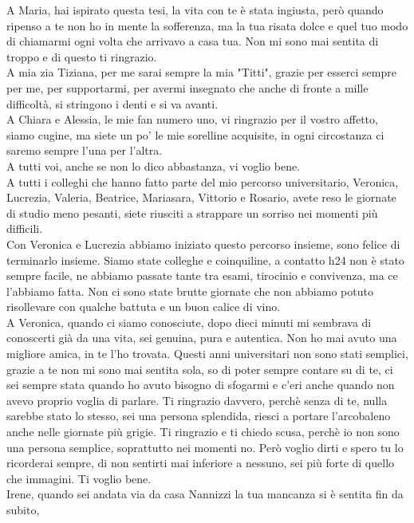 A Maria, hai ispirato questa tesi, la vita con te è stata ingiusta, però quando ripenso a te non ho in mente
la sofferenza, ma la tua risata dolce e quel tuo modo di chiamarmi ogni volta che arrivavo a casa tua. Non mi sono mai 
sentita di troppo e di questo ti ringrazio.\\
A mia zia Tiziana, per me sarai sempre la mia "Titti", grazie per esserci sempre per me, per supportarmi, per avermi
insegnato che anche di fronte a mille difficoltà, si stringono i denti e si va avanti.\\
A Chiara e Alessia, le mie fan numero uno, vi ringrazio per il vostro affetto, siamo cugine, ma siete un po' le mie 
sorelline acquisite, in ogni circostanza ci saremo sempre l’una per l’altra.\\
A tutti voi, anche se non lo dico abbastanza, vi voglio bene.\\
A tutti i colleghi che hanno fatto parte del mio percorso universitario, 
Veronica, Lucrezia, Valeria, Beatrice, Mariasara, Vittorio e Rosario, avete reso le giornate di studio meno 
pesanti, siete riusciti a strappare un sorriso nei momenti più difficili.\\
Con Veronica e Lucrezia abbiamo iniziato questo percorso insieme, sono felice di terminarlo insieme. 
Siamo state colleghe e coinquiline, a contatto h24 non è stato sempre facile, ne abbiamo passate tante
tra esami, tirocinio e convivenza, ma ce l’abbiamo fatta. Non ci sono state brutte giornate che non abbiamo 
potuto risollevare con qualche battuta e un buon calice di vino.\\
A Veronica, quando ci siamo conosciute, dopo dieci minuti mi sembrava di conoscerti già da 
una vita, sei genuina, pura e autentica. Non ho mai avuto una migliore amica, in te l’ho trovata. Questi anni universitari 
non sono stati semplici, grazie a te non mi sono mai sentita sola, so di poter sempre contare su di te, ci sei sempre 
stata quando ho avuto bisogno di sfogarmi e c’eri anche quando non avevo proprio voglia di parlare. 
Ti ringrazio davvero, perchè senza di te, nulla sarebbe stato lo stesso, 
sei una persona splendida, riesci a portare l’arcobaleno anche nelle giornate più grigie. 
Ti ringrazio e ti chiedo scusa, perchè io non sono una persona semplice, soprattutto nei momenti no. Però voglio dirti e 
spero tu lo ricorderai sempre, di non sentirti mai inferiore a nessuno, sei più forte di quello che immagini. 
Ti voglio bene.\\
Irene, quando sei andata via da casa Nannizzi la tua mancanza si è sentita fin da subito, 

